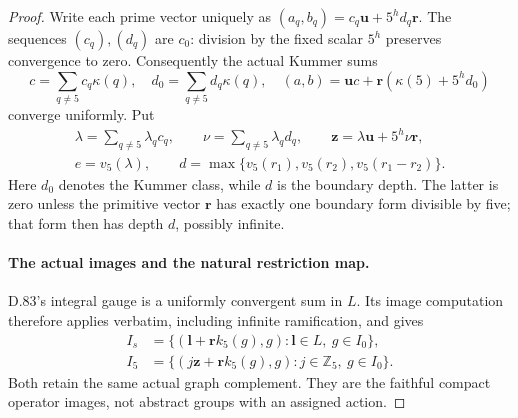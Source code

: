 \begin{proof}
Write each prime vector uniquely as
\((a_q,b_q)=c_q\mathbf u+5^h d_q\mathbf r\).
The sequences \((c_q),(d_q)\) are \(c_0\): division by
the fixed scalar \(5^h\) preserves convergence to zero.
Consequently the actual Kummer sums
\[
 c=\sum_{q\ne5}c_q\kappa(q),\quad
 d_0=\sum_{q\ne5}d_q\kappa(q),\quad
 (a,b)=\mathbf u c+\mathbf r(\kappa(5)+5^h d_0)
                                                               \tag{D.85.8}
\]
converge uniformly. Put
\[
 \begin{gathered}
 \lambda=\sum_{q\ne5}\lambda_qc_q,\qquad
 \nu=\sum_{q\ne5}\lambda_qd_q,\qquad
 \mathbf z=\lambda\mathbf u+5^h\nu\mathbf r,\\
 e=v_5(\lambda),\qquad
 d=\max\{v_5(r_1),v_5(r_2),v_5(r_1-r_2)\}.
 \end{gathered}
                                                               \tag{D.85.9}
\]
Here \(d_0\) denotes the Kummer class, while \(d\) is
the boundary depth. The latter is zero unless the primitive
vector \(\mathbf r\) has exactly one boundary form divisible
by five; that form then has depth \(d\), possibly infinite.

\paragraph{The actual images and the natural restriction map.}
D.83's integral gauge is a uniformly convergent sum in
\(L\). Its image computation therefore applies verbatim,
including infinite ramification, and gives
\[
 \begin{split}
 I_s&=\{(\mathbf l+\mathbf r k_5(g),g):
                               \mathbf l\in L,\ g\in I_0\},\\
 I_5&=\{(j\mathbf z+\mathbf r k_5(g),g):
                               j\in\mathbb Z_5,\ g\in I_0\}.
 \end{split}                                                   \tag{D.85.10}
\]
Both retain the same actual graph complement. They are
the faithful compact operator images, not abstract groups
with an assigned action.


\end{proof}
